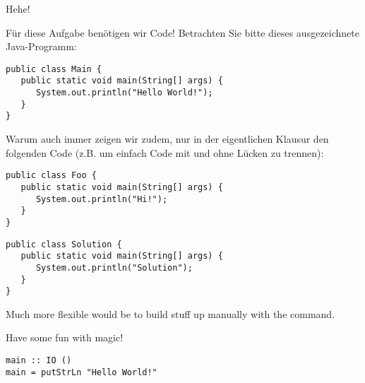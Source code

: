 \begin{exercise}[5]{Hehe!}
\label{ex:second}%

Für diese Aufgabe benötigen wir Code!
Betrachten Sie bitte dieses ausgezeichnete Java-Programm:

\begin{verbatim}
public class Main {
   public static void main(String[] args) {
      System.out.println("Hello World!");
   }
}
\end{verbatim}

\begin{examonly}
Warum auch immer zeigen wir zudem, nur in der eigentlichen Klausur den folgenden Code (z.B. um einfach Code mit und ohne Lücken zu trennen):

\begin{verbatim}
public class Foo {
   public static void main(String[] args) {
      System.out.println("Hi!");
   }
}
\end{verbatim}
\bigskip

\IndentGuides{9cm}

\IndentGuidesDistance{0.5cm}
\IndentGuides[4]{5cm}

\end{examonly}

\begin{solution}
\begin{verbatim}
public class Solution {
   public static void main(String[] args) {
      System.out.println("Solution");
   }
}
\end{verbatim}
\end{solution}

Much more flexible would be to build stuff up manually with the \string\ifinmode\space command.

\begin{solutionbox}
   Have some fun with magic!

\begin{verbatim}
main :: IO ()
main = putStrLn "Hello World!"
\end{verbatim}
\end{solutionbox}
\fi

\end{exercise}
